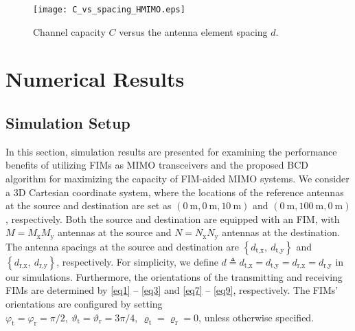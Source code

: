 \documentclass[lettersize,journal]{IEEEtran}
\begin{document}
\begin{figure}[!t]
\centering
\texttt{[image: C\_vs\_spacing\_HMIMO.eps]}
\caption{Channel capacity $C$ versus the antenna element spacing $d$.}\vspace{-0.5cm}
\label{fig_5}
\end{figure}
\section{Numerical Results}\label{sec4}
\subsection{Simulation Setup}\label{sec4_1} 
In this section, simulation results are presented for examining the performance benefits of utilizing FIMs as MIMO transceivers and the proposed BCD algorithm for maximizing the capacity of FIM-aided MIMO systems. We consider a 3D Cartesian coordinate system, where the locations of the reference antennas at the source and destination are set as $\left ( 0\ \text{m}, 0\ \text{m}, 10\ \text{m} \right )$ and $\left ( 0\ \text{m}, 100\ \text{m}, 0\ \text{m} \right )$, respectively. Both the source and destination are equipped with an FIM, with $M=M_{\textrm{x}}M_{\textrm{y}}$ antennas at the source and $N = N_{\textrm{x}}N_{\textrm{y}}$ antennas at the destination. The antenna spacings at the source and destination are $\left \{ d_{\textrm{t},\textrm{x}},\ d_{\textrm{t},\textrm{y}} \right \}$ and $\left \{ d_{\textrm{r},\textrm{x}},\ d_{\textrm{r},\textrm{y}} \right \}$, respectively. For simplicity, we define $d \triangleq d_{\textrm{t},\textrm{x}} = d_{\textrm{t},\textrm{y}} = d_{\textrm{r},\textrm{x}} = d_{\textrm{r},\textrm{y}} $ in our simulations. Furthermore, the orientations of the transmitting and receiving FIMs are determined by \eqref{eq1} -- \eqref{eq3} and \eqref{eq7} -- \eqref{eq9}, respectively. The FIMs' orientations are configured by setting $\varphi _{\textrm{t}} = \varphi _{\textrm{r}} = \pi/2,\ \vartheta _{\textrm{t}}= \vartheta _{\textrm{r}} =3\pi/4,\ \varrho _{\textrm{t}}=\varrho _{\textrm{r}} = 0$, unless otherwise specified.
\end{document}
